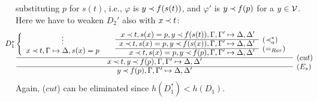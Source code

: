 \begin{PROOF}
\begin{LS}
\begin{LSA}
\begin{LSB}
\begin{LSC}
\begin{LSD}
substituting $p$ for $s(t)$, i.e., $\varphi$ is $y\mathbin{\prec} f(s(t))$, and $\varphi'$ is
 $y\mathbin{\prec} f(p)$ for a $y\in{\cal V}$. Here we have to weaken $D_2'$ also with $x\mathbin{\prec} t$:
\[ \begin{array}{cl} \hspace*{-2em}
D_1^* \left \{ \begin{array}{c} \vdots \\ 
 x\Incl t, \GSD, s(x)=p \end{array} \right . \ \ \ \ 
\begin{array}{rl}
 x\Incl t, s(x)=p, y\Incl f(s(t)), \Gamma, \Gamma' \Seq \Delta, \Delta' \\
 \cline{1-1}
x\Incl t, s(x)=p, y\Incl f(s(x)), \Gamma, \Gamma' \Seq \Delta, \Delta' 
 &   \raisebox{1.2ex}[1.5ex][0ex]{($\Incl_a^*$)} \\ \cline{1-1}
x\Incl t, s(x)=p, y\Incl f(p), \Gamma, \Gamma' \Seq \Delta, \Delta' 
 &   \raisebox{1.2ex}[1.5ex][0ex]{($=_{Rar}$)} 
 \end{array} \\ \cline{1-1}
x\Incl t, y\Incl f(p), \Gamma, \Gamma' \Seq \Delta, \Delta' 
 &   \raisebox{1.2ex}[1.5ex][0ex]{($cut$)} \\ \cline{1-1}
y\Incl f(p), \Gamma, \Gamma' \Seq \Delta, \Delta' 
 &   \raisebox{1.2ex}[1.5ex][0ex]{($E_s$)}
\end{array} \]
Again, ($cut$) can be eliminated since $h(D_1^*)<h(D_1)$.
\end{LSD}
\end{LSC}
\end{LSB}
\end{LSA}
\end{LS}
\end{PROOF}
